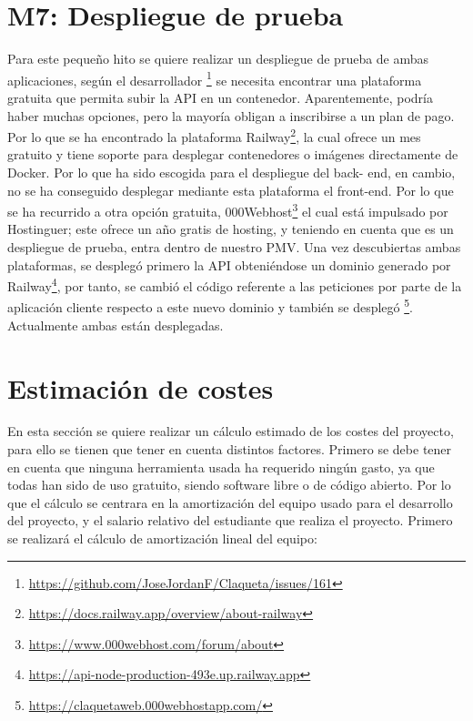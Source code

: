 \section{M7: Despliegue de prueba}

Para este pequeño hito se quiere realizar un despliegue de prueba de ambas aplicaciones, según el desarrollador 
\footnote{\url{https://github.com/JoseJordanF/Claqueta/issues/161}} se necesita encontrar una plataforma gratuita que 
permita subir la API en un contenedor\cite{BenefDocker}. Aparentemente, podría haber muchas opciones, pero la mayoría 
obligan a inscribirse a un plan de pago. Por lo que se ha encontrado la plataforma 
Railway\footnote{\url{https://docs.railway.app/overview/about-railway}}, la cual ofrece un mes gratuito y tiene soporte 
para desplegar contenedores o imágenes directamente de Docker. Por lo que ha sido escogida para el despliegue del back-
end, en cambio, no se ha conseguido desplegar mediante esta plataforma el front-end. Por lo que se ha recurrido a otra 
opción gratuita, 000Webhost\footnote{\url{https://www.000webhost.com/forum/about}} el cual está impulsado por 
Hostinguer\cite{WhatIsHostinger}; este ofrece un año gratis de hosting, y teniendo en cuenta que es un despliegue de 
prueba, entra dentro de nuestro PMV. Una vez descubiertas ambas plataformas, se desplegó primero la API obteniéndose un 
dominio generado por Railway\footnote{\url{https://api-node-production-493e.up.railway.app}}, por tanto, se cambió el 
código referente a las peticiones por parte de la aplicación cliente respecto a este nuevo dominio y también se desplegó 
\footnote{\url{https://claquetaweb.000webhostapp.com/}}. Actualmente ambas están desplegadas.

\section{Estimación de costes}

En esta sección se quiere realizar un cálculo estimado de los costes del proyecto, para ello se tienen que tener en 
cuenta distintos factores. Primero se debe tener en cuenta que ninguna herramienta usada ha requerido ningún gasto, ya 
que todas han sido de uso gratuito, siendo software libre o de código abierto. Por lo que el cálculo se centrara en la 
amortización del equipo usado para el desarrollo del proyecto, y el salario relativo del estudiante que realiza el 
proyecto. Primero se realizará el cálculo de amortización lineal del equipo\cite{CalcAmortizacion}:

